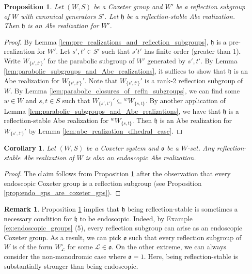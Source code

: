 \documentclass{amsart}
\newcommand{\scrL}{\mathcal{L}}
\newcommand{\fr}[1]{\mathfrak{#1}}
\newtheorem{corollary}[subsubsection]{Corollary}
\newtheorem{proposition}[subsubsection]{Proposition}
\theoremstyle{definition}
\newtheorem{remark}[subsubsection]{Remark}
\numberwithin{equation}{subsection}
\begin{document}
\begin{proposition}\label{prop:refl_abe_realizations}
    Let $(W,S)$ be a Coxeter group and $W'$ be a reflection subgroup of $W$ with canonical generators $S'$.
    Let $\fr{h}$ be a reflection-stable Abe realization. Then $\fr{h}$ is an Abe realization for $W'$.
\end{proposition}
\begin{proof}
    By Lemma \ref{lem:pre_realizations_and_reflection_subgroups}, $\fr{h}$ is a pre-realization for $W'$.
    Let $s',t' \in S'$ such that $s' t'$ has finite order (greater than 1). Write $W_{\{s',t'\}}'$ for the parabolic subgroup of $W'$ generated by $s', t'$.
    By Lemma \ref{lem:parabolic_subgroups_and_Abe_realizations}, it suffices to show that $\fr{h}$ is an Abe realization for $W_{\{s',t'\}}'$.
    Note that $W_{\{s',t'\}}'$ is a rank-2 reflection subgroup of $W$.
    By Lemma \ref{lem:parabolic_closures_of_refln_subgroups}, we can find some $w\in W$ and $s,t \in S$ such that $W_{\{s',t'\}}' \subseteq {}^w W_{\{s,t\}}$.
    By another application of Lemma  \ref{lem:parabolic_subgroups_and_Abe_realizations}, we have that $\fr{h}$ is a reflection-stable Abe realization for ${}^w W_{\{s,t\}}$.
    Then $\fr{h}$ is an Abe realization for $W_{\{s',t'\}}'$ by Lemma \ref{lem:abe_realization_dihedral_case}.
\end{proof}

\begin{corollary}\label{cor:refl_abe_are_endo}
    Let $(W,S)$ be a Coxeter system and $\fr{o}$ be a $W$-set.
    Any reflection-stable Abe realization of $W$ is also an endoscopic Abe realization.
\end{corollary}
\begin{proof}
    The claim follows from Proposition \ref{prop:refl_abe_realizations} after the observation that every endoscopic Coxeter group is a reflection subgroup (see Proposition \ref{prop:endo_gps_are_coxeter_gps}). 
\end{proof}

\begin{remark}
    Proposition \ref{prop:refl_abe_realizations} implies that $\fr{h}$ being reflection-stable is sometimes a necessary condition for $\fr{h}$ to be endoscopic.
    Indeed, by Example \ref{ex:endoscopic_groups} (5), every reflection subgroup can arise as an endoscopic Coxeter group. As a result, we can pick $\fr{o}$ such that every reflection subgroup of $W$ is of the form $W_{\scrL}^{\circ}$ for some $\scrL \in \fr{o}$.
    On the other extreme, we can always consider the non-monodromic case where $\fr{o} = 1$. Here, being reflection-stable is substantially stronger than being endoscopic.     
\end{remark}
\end{document}
